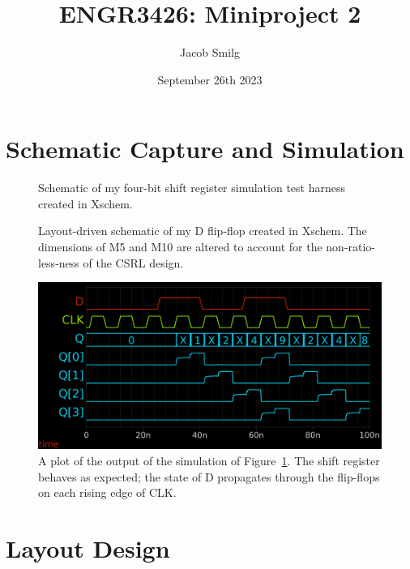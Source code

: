 \documentclass{article}
\title{ENGR3426: Miniproject 2}
\author{Jacob Smilg}
\date{September 26th 2023}
\begin{document}
\maketitle

\section{Schematic Capture and Simulation}

\begin{figure}[!ht]
    \centering
    
    \caption{Schematic of my four-bit shift register simulation test harness created in Xschem.}\label{fig:sim_schem}
\end{figure}

\begin{figure}[!ht]
    \centering
    
    \caption{Layout-driven schematic of my D flip-flop created in Xschem. The dimensions of M5 and M10 are altered to account for the non-ratio-less-ness of the CSRL design.}\label{fig:flipflop_schem}
\end{figure}

\begin{figure}[!ht]
    \centering
    \includegraphics[width=.9\columnwidth]{../simulation/stackedplot.png}
    \caption{A plot of the output of the simulation of Figure~\ref{fig:sim_schem}. The shift register behaves as expected; the state of D propagates through the flip-flops on each rising edge of CLK.}\label{fig:simplot}
\end{figure}

\clearpage

\section{Layout Design}
\end{document}
